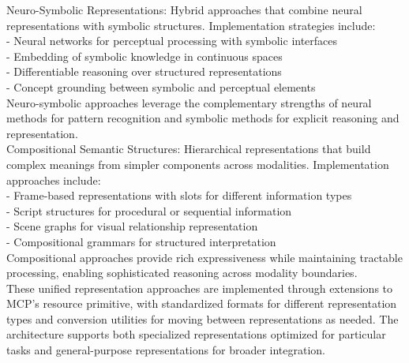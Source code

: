 Neuro-Symbolic Representations: Hybrid approaches that combine neural representations with symbolic structures. Implementation strategies include:\\ \newline
- Neural networks for perceptual processing with symbolic interfaces\\ \newline
- Embedding of symbolic knowledge in continuous spaces\\ \newline
- Differentiable reasoning over structured representations\\ \newline
- Concept grounding between symbolic and perceptual elements\\ \newline
Neuro-symbolic approaches leverage the complementary strengths of neural methods for pattern recognition and symbolic methods for explicit reasoning and representation.\\ \newline
Compositional Semantic Structures: Hierarchical representations that build complex meanings from simpler components across modalities. Implementation approaches include:\\ \newline
- Frame-based representations with slots for different information types\\ \newline
- Script structures for procedural or sequential information\\ \newline
- Scene graphs for visual relationship representation\\ \newline
- Compositional grammars for structured interpretation\\ \newline
Compositional approaches provide rich expressiveness while maintaining tractable processing, enabling sophisticated reasoning across modality boundaries.\\ \newline
These unified representation approaches are implemented through extensions to MCP's resource primitive, with standardized formats for different representation types and conversion utilities for moving between representations as needed. The architecture supports both specialized representations optimized for particular tasks and general-purpose representations for broader integration.\\
